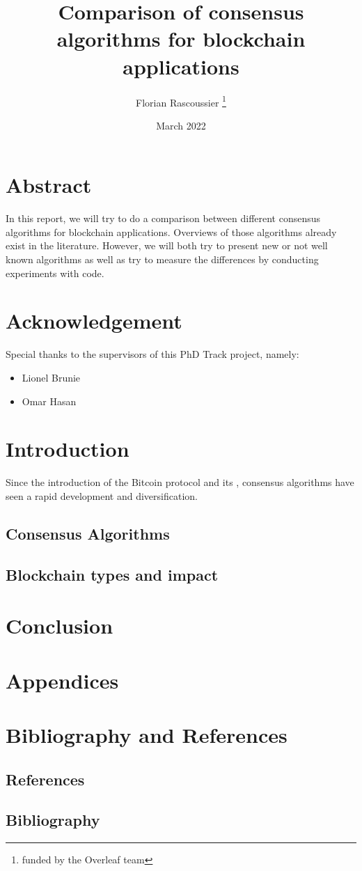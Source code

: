 \documentclass[12pt]{article} %
\title{Comparison of consensus algorithms for blockchain applications}
\author{Florian Rascoussier \thanks{funded by the Overleaf team}}
\date{March 2022}
\begin{document}

\newpage


\newpage

\section{Abstract}
In this report, we will try to do a comparison between different consensus 
algorithms for blockchain applications. Overviews of those algorithms 
already exist in the literature. However, we will both try to present
new or not well known algorithms as well as try to measure the 
differences by conducting experiments with code.

\section{Acknowledgement}
Special thanks to the supervisors of this PhD Track project, namely:
\begin{itemize}
    \item Lionel Brunie
    \item Omar Hasan
\end{itemize}

\newpage
\tableofcontents

\newpage
\section{Introduction}
Since the introduction of the Bitcoin protocol and its 
 \cite{Nakamoto2009-uw}, consensus algorithms have 
seen a rapid development and diversification. 

\subsection{Consensus Algorithms}

\subsection{Blockchain types and impact}

\section{}


\section{Conclusion}

\section{Appendices}


\newpage
\section{Bibliography and References}

\subsection{References}


\subsection{Bibliography}


\restoregeometry
\end{document}
